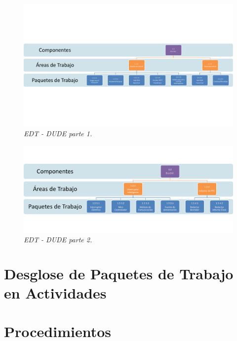 \begin{figure}[H]
  \centering
  \includegraphics[width=\textwidth, keepaspectratio]{images/dude_1_edt}
  \caption{\textit{EDT - DUDE parte 1.}}
  \label{fig:dude_1_edt}
\end{figure}

\begin{figure}[H]
  \centering
  \includegraphics[width=\textwidth, keepaspectratio]{images/dude_2_edt}
  \caption{\textit{EDT - DUDE parte 2.}}
  \label{fig:dude_2_edt}
\end{figure}

\section{Desglose de Paquetes de Trabajo en Actividades}

\section{Procedimientos}

